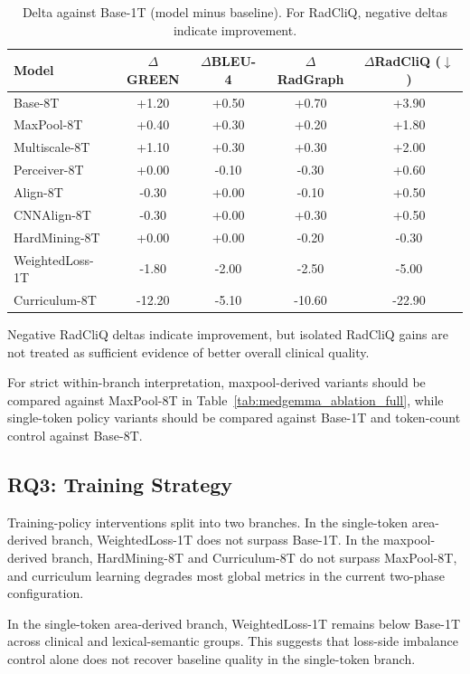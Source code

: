 \begin{table}[htbp]
    \centering
    \caption{Delta against Base-1T (model minus baseline). For RadCliQ, negative deltas indicate improvement.}
    \label{tab:delta_vs_baseline}
    \begin{tabular}{lcccc}
        \toprule
        \textbf{Model} & $\Delta$GREEN & $\Delta$BLEU-4 & $\Delta$RadGraph & $\Delta$RadCliQ ($\downarrow$) \\\midrule
        Base-8T & +1.20 & +0.50 & +0.70 & +3.90 \\
        MaxPool-8T & +0.40 & +0.30 & +0.20 & +1.80 \\
        Multiscale-8T & +1.10 & +0.30 & +0.30 & +2.00 \\
        Perceiver-8T & +0.00 & -0.10 & -0.30 & +0.60 \\
        Align-8T & -0.30 & +0.00 & -0.10 & +0.50 \\
        CNNAlign-8T & -0.30 & +0.00 & +0.30 & +0.50 \\
        HardMining-8T & +0.00 & +0.00 & -0.20 & -0.30 \\
        WeightedLoss-1T & -1.80 & -2.00 & -2.50 & -5.00 \\
        Curriculum-8T & -12.20 & -5.10 & -10.60 & -22.90 \\
        \bottomrule
    \end{tabular}
\end{table}

Negative \ac{RadCliQ} deltas indicate improvement, but isolated \ac{RadCliQ} gains are not treated as sufficient evidence of better overall clinical quality.

For strict within-branch interpretation, maxpool-derived variants should be compared against MaxPool-8T in Table~\ref{tab:medgemma_ablation_full}, while single-token policy variants should be compared against Base-1T and token-count control against Base-8T.

\subsection{RQ3: Training Strategy}
Training-policy interventions split into two branches. In the single-token area-derived branch, WeightedLoss-1T does not surpass Base-1T. In the maxpool-derived branch, HardMining-8T and Curriculum-8T do not surpass MaxPool-8T, and curriculum learning degrades most global metrics in the current two-phase configuration.

In the single-token area-derived branch, WeightedLoss-1T remains below Base-1T across clinical and lexical-semantic groups. This suggests that loss-side imbalance control alone does not recover baseline quality in the single-token branch.


